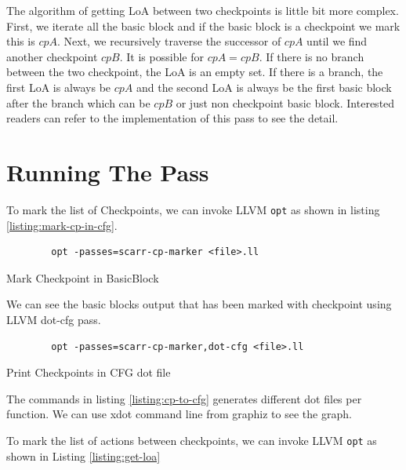 The algorithm of getting LoA between two checkpoints is little bit more complex.
First, we iterate all the basic block and if the basic block is a checkpoint we
mark this is $cpA$. Next, we recursively traverse the successor of $cpA$ until
we find another checkpoint $cpB$. It is possible for $cpA = cpB$. If there is no
branch between the two checkpoint, the LoA is an empty set. If there is a
branch, the first LoA is always be $cpA$ and the second LoA is always be the
first basic block after the branch \textemdash{} which can be $cpB$ or just non
checkpoint basic block. Interested readers can refer to the implementation of
this pass to see the detail.

\section{Running The Pass}


To mark the list of Checkpoints, we can invoke LLVM \texttt{opt} as shown in
listing \ref{listing:mark-cp-in-cfg}.

\begin{listing}[htbp]
    \begin{verbatim}
        opt -passes=scarr-cp-marker <file>.ll
    \end{verbatim}
    \caption{Mark Checkpoint in BasicBlock}    
    \label{listing:mark-cp-in-cfg}
\end{listing}

We can see the basic blocks output that has been marked with checkpoint using
LLVM dot-cfg pass.

\begin{listing}[htbp]
    \begin{verbatim}
        opt -passes=scarr-cp-marker,dot-cfg <file>.ll
    \end{verbatim}
    \caption{Print Checkpoints in CFG dot file}    
    \label{listing:cp-to-cfg}
\end{listing}

The commands in listing \ref{listing:cp-to-cfg} generates different dot files
per function. We can use xdot command line from graphiz to see the graph. 

To mark the list of actions between checkpoints, we can invoke LLVM \texttt{opt}
as shown in Listing \ref{listing:get-loa}

